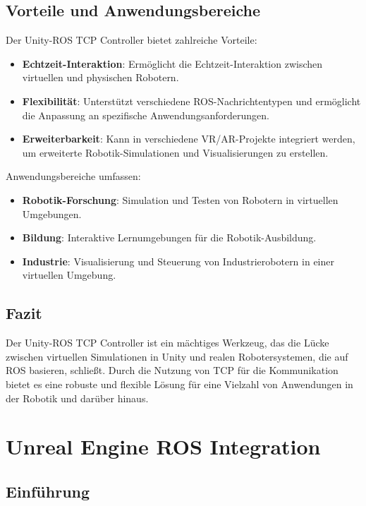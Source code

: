 \subsection{Vorteile und Anwendungsbereiche}

Der Unity-ROS TCP Controller bietet zahlreiche Vorteile:

\begin{itemize}
    \item \textbf{Echtzeit-Interaktion}: Ermöglicht die Echtzeit-Interaktion zwischen virtuellen und physischen Robotern.
    \item \textbf{Flexibilität}: Unterstützt verschiedene ROS-Nachrichtentypen und ermöglicht die Anpassung an spezifische Anwendungsanforderungen.
    \item \textbf{Erweiterbarkeit}: Kann in verschiedene VR/AR-Projekte integriert werden, um erweiterte Robotik-Simulationen und Visualisierungen zu erstellen.
\end{itemize}

Anwendungsbereiche umfassen:

\begin{itemize}
    \item \textbf{Robotik-Forschung}: Simulation und Testen von Robotern in virtuellen Umgebungen.
    \item \textbf{Bildung}: Interaktive Lernumgebungen für die Robotik-Ausbildung.
    \item \textbf{Industrie}: Visualisierung und Steuerung von Industrierobotern in einer virtuellen Umgebung.
\end{itemize}

\subsection{Fazit}

Der Unity-ROS TCP Controller ist ein mächtiges Werkzeug, das die Lücke zwischen virtuellen Simulationen in Unity und realen Robotersystemen, die auf ROS basieren, schließt. Durch die Nutzung von TCP für die Kommunikation bietet es eine robuste und flexible Lösung für eine Vielzahl von Anwendungen in der Robotik und darüber hinaus.
\section{Unreal Engine ROS Integration}

\subsection{Einführung}

